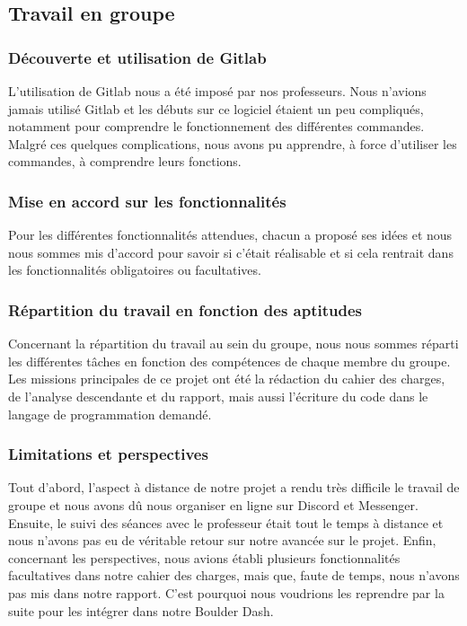     \subsection{Travail en groupe}
        
        \subsubsection{Découverte et utilisation de Gitlab} L'utilisation de Gitlab nous a été imposé par nos professeurs. Nous n'avions jamais utilisé Gitlab et les débuts sur ce logiciel étaient un peu compliqués, notamment pour comprendre le fonctionnement des différentes commandes. Malgré ces quelques complications, nous avons pu apprendre, à force d'utiliser les commandes, à comprendre leurs fonctions. 
        
        
        \subsubsection{Mise en accord sur les fonctionnalités} Pour les différentes fonctionnalités attendues, chacun a proposé ses idées et nous nous sommes mis d'accord pour savoir si c'était réalisable et si cela rentrait dans les fonctionnalités obligatoires ou facultatives. 
        
        
        \subsubsection{Répartition du travail en fonction des aptitudes}
        Concernant la répartition du travail au sein du groupe, nous nous sommes réparti les différentes tâches en fonction des compétences de chaque membre du groupe. Les missions principales de ce projet ont été la rédaction du cahier des charges, de l'analyse descendante et du rapport, mais aussi l'écriture du code dans le langage de programmation demandé.
        
         \subsubsection{Limitations et perspectives}
        Tout d'abord, l'aspect à distance de notre projet a rendu très difficile le travail de groupe et nous avons dû nous organiser en ligne sur Discord et Messenger. Ensuite, le suivi des séances avec le professeur était tout le temps à distance et nous n'avons pas eu de véritable retour sur notre avancée sur le projet. Enfin, concernant les perspectives, nous avions établi plusieurs fonctionnalités facultatives dans notre cahier des charges, mais que, faute de temps, nous n'avons pas mis dans notre rapport. C'est pourquoi nous voudrions les reprendre par la suite pour les intégrer dans notre Boulder Dash.
        
        
